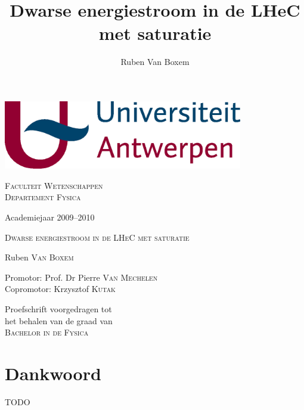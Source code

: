 \documentclass[a4paper,11pt]{article}
\title{Dwarse energiestroom in de LHeC met saturatie}
\author{Ruben Van Boxem}
\numberwithin{equation}{section} %
\begin{document}
\fontsize{12pt}{14pt}\selectfont

\begin{center}

\includegraphics[height=3cm]{Afbeeldingen/UA.eps}

\vspace{1cm}

\fontsize{14pt}{17pt}\selectfont
\textsc{Faculteit Wetenschappen} \\
\textsc{Departement Fysica}
\fontsize{12pt}{14pt}\selectfont
\vspace{0.3cm}

\vspace{1.2cm}

Academiejaar 2009--2010

\vspace{2.8cm}

\fontsize{17.28pt}{21pt}\selectfont

\textsc{Dwarse energiestroom in de LHeC met saturatie}

\fontsize{12pt}{14pt}\selectfont

\vspace{3cm}

Ruben \textsc{Van Boxem}	


\vspace{2cm}

Promotor: Prof. Dr Pierre \textsc{Van Mechelen}\\
Copromotor: Krzysztof \textsc{Kutak} \\
\vspace{2cm}
\end{center}
Proefschrift voorgedragen tot \\
het behalen van de graad van\\
\textsc{Bachelor in de Fysica}


\thispagestyle{empty}
\newpage

\section*{Dankwoord}
TODO
\thispagestyle{empty}
\newpage
\fontsize{11pt}{14pt}\selectfont
\end{document}
